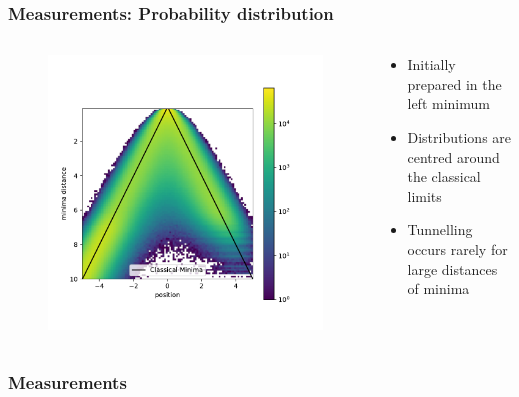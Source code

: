 \documentclass[aspectratio=169]{beamer}
\begin{document}
\begin{frame}
	\frametitle{Measurements: Probability distribution}
	\vspace{-15px}
	\begin{columns}
		\begin{column}{0.55\textwidth}
			\begin{figure}[H]
				\centering
				\includegraphics[width=\textwidth]{../imgs/anharmonic_oscillator_lambda_parameter/track_100001000_lambda_parameter.pdf}
				\label{fig:anharmonic_oscillator_lambda_parameter}
			\end{figure}
		\end{column}
		\begin{column}{0.44\textwidth}
			\begin{itemize}
				\item Initially prepared in the left minimum
				\item Distributions are centred around the classical limits
				\item Tunnelling occurs rarely for large distances of minima
			\end{itemize}
		\end{column}
	\end{columns}
\end{frame}


\begin{frame}
\frametitle{Measurements}

\end{frame}
\end{document}
